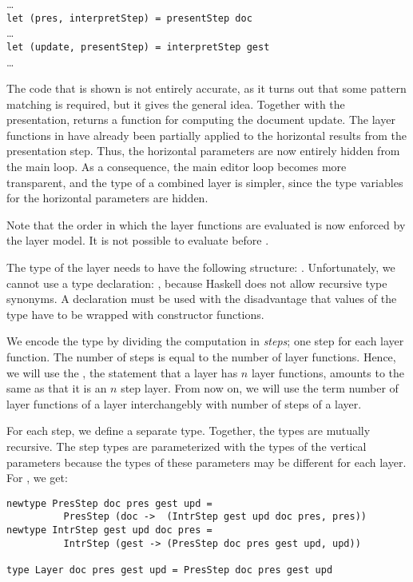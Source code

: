 \documentclass[preprint,natbib]{sigplanconf}
\begin{document}
\dots\\
{\tt let (pres, interpretStep) = presentStep doc}\\
\dots\\
{\tt let (update, presentStep) = interpretStep gest}\\
\dots

The code that is shown is not entirely accurate, as it turns out that some pattern matching is required, but it gives the general idea. Together with the presentation,  returns a function  for computing the document update. The layer functions in  have already been partially applied to the horizontal results from the presentation step. Thus, the horizontal parameters are now entirely hidden from the main loop.  As a consequence, the main editor loop becomes more transparent, and the type of a combined layer is simpler, since the type variables for the horizontal parameters are hidden.

\bc Note that the order in which the layer functions are evaluated is now enforced by the layer model. It is not possible to evaluate  before .  \ec



The type of the layer needs to have the following structure: 
.  Unfortunately, we cannot use a type declaration: , because Haskell does not allow recursive type synonyms. A  declaration must be used with the disadvantage that values of the type have to be wrapped with constructor functions.

\bc
We encode the type by dividing the computation in {\em steps}; one step for each layer function. The number of steps is equal to the number of layer functions. Hence, we will use the , the statement that a layer has $n$ layer functions, amounts to the same as that it is an $n$ step layer. From now on, we will use the term number of layer functions of a layer interchangebly with number of steps of a layer.

For each step, we define a separate type. Together, the types are mutually recursive. The step types are parameterized with the types of the vertical parameters because the types of these parameters may be different for each layer. For , we get:

\begin{small}
\begin{verbatim}
newtype PresStep doc pres gest upd = 
          PresStep (doc ->  (IntrStep gest upd doc pres, pres))
newtype IntrStep gest upd doc pres = 
          IntrStep (gest -> (PresStep doc pres gest upd, upd)) 

type Layer doc pres gest upd = PresStep doc pres gest upd  
\end{verbatim}
\end{small}
\end{document}
